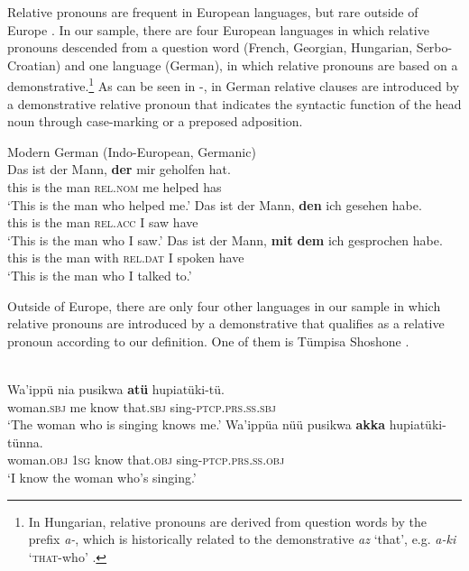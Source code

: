 \documentclass[output=paper,colorlinks,citecolor=brown]{langscibook}
\begin{document}
Relative pronouns are frequent in European languages, but rare outside of Europe \citep{Comrie2006}. In our sample, there are four European languages in which relative pronouns descended from a question word (French, Georgian, Hungarian, Serbo-Croatian) and one language (German), in which relative pronouns are based on a demonstrative.\footnote{In Hungarian, relative pronouns are derived from question words by the prefix \textit{a-}, which is historically related to the demonstrative \textit{az} ‘that’, e.g. \textit{a-ki} ‘\textsc{that-}who’ \citep[40]{KeneseiEtAl1998}.} As can be seen in -, in German relative clauses are introduced by a demonstrative relative pronoun that indicates the syntactic function of the head noun through case-marking or a preposed adposition.

\ea\label{ex:diessel:1}
{Modern German (Indo-European, Germanic)}\\
\ea\label{ex:diessel:1a}
\gll   Das  ist   der   Mann,  \textbf{der}   mir   geholfen   hat.\\
       this  is   the   man  \textsc{rel.nom} me  helped   has\\
\glt ‘This is the man who helped me.’
\ex\label{ex:diessel:1b}
\gll   Das  ist   der   Mann,  \textbf{den}  ich   gesehen   habe.\\
       this  is   the   man  \textsc{rel.acc}  I  saw  have\\
\glt ‘This is the man who I saw.’
\ex\label{ex:diessel:1c}
\gll   Das  ist der   Mann,  \textbf{mit}  \textbf{dem}  ich gesprochen   habe.\\
       this  is the   man  with  \textsc{rel.dat}   I spoken  have\\
\glt ‘This is the man who I talked to.’
\z
\z

Outside of Europe, there are only four other languages in our sample in which relative pronouns are introduced by a demonstrative that qualifies as a relative pronoun according to our definition. One of them is Tümpisa Shoshone .

\ea\label{ex:diessel:2}
\\
\ea\label{ex:diessel:2a} 
\gll   Wa’ippü    nia  pusikwa   {\ob}\textbf{atü}   hupiatüki-tü{\cb}.\\
       woman.\textsc{sbj}  me  know  {\db}that.\textsc{sbj}   sing-\textsc{ptcp.prs.ss.sbj}\\
\glt ‘The woman who is singing knows me.’
\ex\label{ex:diessel:2b}
\gll   Wa’ippüa   nüü  pusikwa  {\ob}\textbf{akka}   hupiatüki-tünna{\cb}.\\
       woman.\textsc{obj}  \textsc{1sg}  know {\db}that.\textsc{obj}   sing-\textsc{ptcp.prs.ss.obj}\\
\glt ‘I know the woman who’s singing.’
\z
\z
\end{document}
